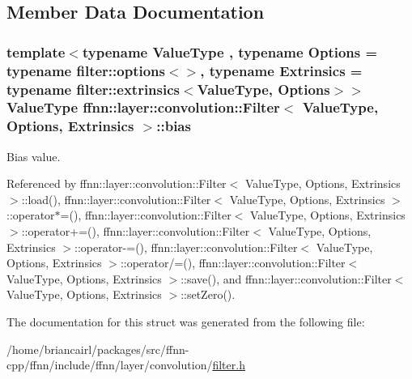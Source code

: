 \subsection{Member Data Documentation}
\hypertarget{structffnn_1_1layer_1_1convolution_1_1_filter_a3638f1ebfd8d5d4469392dd7b2470cc3}{
\subsubsection[{bias}]{\setlength{\rightskip}{0pt plus 5cm}template$<$typename Value\-Type , typename Options  = typename filter\-::options$<$$>$, typename Extrinsics  = typename filter\-::extrinsics$<$\-Value\-Type, Options$>$$>$ Value\-Type {\bf ffnn\-::layer\-::convolution\-::\-Filter}$<$ Value\-Type, Options, Extrinsics $>$\-::bias}}\label{structffnn_1_1layer_1_1convolution_1_1_filter_a3638f1ebfd8d5d4469392dd7b2470cc3}


Bias value. 



Referenced by ffnn\-::layer\-::convolution\-::\-Filter$<$ Value\-Type, Options, Extrinsics $>$\-::load(), ffnn\-::layer\-::convolution\-::\-Filter$<$ Value\-Type, Options, Extrinsics $>$\-::operator$\ast$=(), ffnn\-::layer\-::convolution\-::\-Filter$<$ Value\-Type, Options, Extrinsics $>$\-::operator+=(), ffnn\-::layer\-::convolution\-::\-Filter$<$ Value\-Type, Options, Extrinsics $>$\-::operator-\/=(), ffnn\-::layer\-::convolution\-::\-Filter$<$ Value\-Type, Options, Extrinsics $>$\-::operator/=(), ffnn\-::layer\-::convolution\-::\-Filter$<$ Value\-Type, Options, Extrinsics $>$\-::save(), and ffnn\-::layer\-::convolution\-::\-Filter$<$ Value\-Type, Options, Extrinsics $>$\-::set\-Zero().



The documentation for this struct was generated from the following file\-:\begin{DoxyCompactItemize}
\item 
/home/briancairl/packages/src/ffnn-\/cpp/ffnn/include/ffnn/layer/convolution/\hyperlink{filter_8h}{filter.\-h}\end{DoxyCompactItemize}
